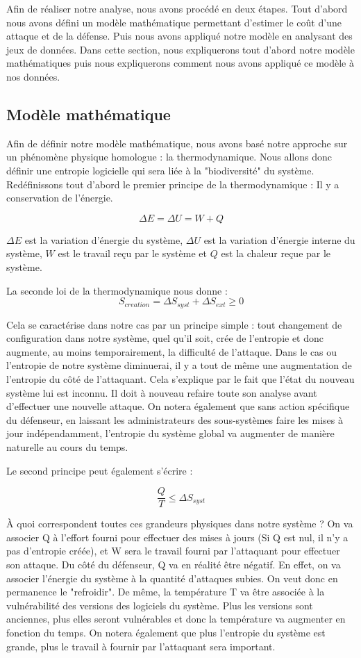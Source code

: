 Afin de réaliser notre analyse, nous avons procédé en deux étapes.
Tout d'abord nous avons défini un modèle mathématique permettant d'estimer le coût d'une attaque et de la défense.
Puis nous avons appliqué notre modèle en analysant des jeux de données.
Dans cette section, nous expliquerons tout d'abord notre modèle mathématiques puis nous expliquerons comment nous avons appliqué ce modèle à nos données.

\subsection{Modèle mathématique}

Afin de définir notre modèle mathématique, nous avons basé notre approche sur un phénomène physique homologue : la thermodynamique.
Nous allons donc définir une entropie logicielle qui sera liée à la "biodiversité" du système.
Redéfinissons tout d'abord le premier principe de la thermodynamique : Il y a conservation de l'énergie. 

\[
\Delta E = \Delta U = W + Q
\]

$\Delta E$ est la variation d'énergie du système, $\Delta U$ est la variation d'énergie interne du système, $W$ est le travail reçu par le système et $Q$ est la chaleur reçue par le système.

La seconde loi de la thermodynamique nous donne :
\[
S_{creation} = \Delta S_{syst} + \Delta S_{ext} \geq 0
\]

Cela se caractérise dans notre cas par un principe simple : tout changement de configuration dans notre système, quel qu'il soit, crée de l'entropie et donc augmente, au moins temporairement, la difficulté de l'attaque.
Dans le cas ou l'entropie de notre système diminuerai, il y a tout de même une augmentation de l'entropie du côté de l'attaquant. Cela s'explique par le fait que l'état du nouveau système lui est inconnu. Il doit à nouveau refaire toute son analyse avant d'effectuer une nouvelle attaque. On notera également que sans action spécifique du défenseur, en laissant les administrateurs des sous-systèmes faire les mises à jour indépendamment, l'entropie du système global va augmenter de manière naturelle au cours du temps. 

Le second principe peut également s'écrire :

\[
\frac{Q}{T} \leq \Delta S_{syst}
\]

À quoi correspondent toutes ces grandeurs physiques dans notre système ? On va associer Q à l'effort fourni pour effectuer des mises à jours (Si Q est nul, il n'y a pas d'entropie créée), et W sera le travail fourni par l'attaquant pour effectuer son attaque. Du côté du défenseur, Q va en réalité être négatif. En effet, on va associer l'énergie du système à la quantité d'attaques subies. On veut donc en permanence le "refroidir".
De même, la température T va être associée à la vulnérabilité des versions des logiciels du système. Plus les versions sont anciennes, plus elles seront vulnérables et donc la température va augmenter en fonction du temps.
On notera également que plus l'entropie du système est grande, plus le travail à fournir par l'attaquant sera important.



